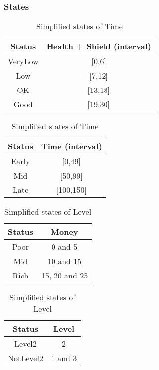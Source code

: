 \documentclass{article}
\begin{document}
  \subsubsection{States}
  \begin{table}[h!]
      \parbox{.45\linewidth}{
        \centering
        \caption{Simplified states of Health}
        \label{tab:tableA*1}
        \begin{tabular}{c|c}
          \textbf{Status} & \textbf{Health + Shield (interval)}\\
          \hline
          VeryLow & [0,6]\\
          Low & [7,12]\\
          OK & [13,18]\\
          Good & [19,30]\\
        \end{tabular}
      }
      \hfil
      \parbox{.45\linewidth}{
        \centering
        \caption{Simplified states of Time}
        \label{tab:tableA*2}
        \begin{tabular}{c|c}
          \textbf{Status} & \textbf{Time (interval)}\\
          \hline
          Early  & [0,49]\\
          Mid & [50,99]\\
          Late & [100,150]\\
        \end{tabular}
      }
  \end{table}
  \begin{table}[h!]
    \parbox{.45\linewidth}{
      \centering
      \caption{Simplified states of Money}
      \label{tab:tableA*3}
      \begin{tabular}{c|c}
        \textbf{Status} & \textbf{Money}\\
        \hline
        Poor & 0 and 5\\
        Mid & 10 and 15\\
        Rich & 15, 20 and 25\\
      \end{tabular}
    }
    \hfil
    \parbox{.45\linewidth}{
      \centering
      \caption{Simplified states of Level}
      \label{tab:tableA*4}
      \begin{tabular}{c|c}
        \textbf{Status} & \textbf{Level}\\
        \hline
        Level2 & 2\\
        NotLevel2 & 1 and 3\\
      \end{tabular}
    }
  \end{table}
\end{document}
